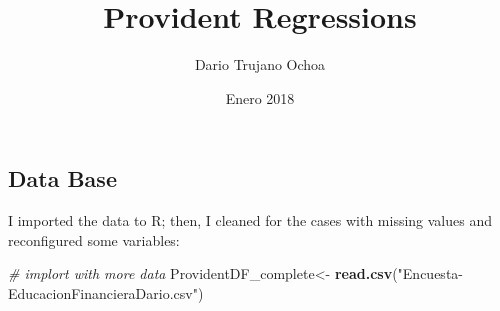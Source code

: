 \documentclass[]{article}
\title{Provident Regressions}
\author{Dario Trujano Ochoa}
\date{Enero 2018}
\newenvironment{Shaded}{\begin{snugshade}}{\end{snugshade}}
\newcommand{\KeywordTok}[1]{\textcolor[rgb]{0.13,0.29,0.53}{\textbf{#1}}}
\newcommand{\StringTok}[1]{\textcolor[rgb]{0.31,0.60,0.02}{#1}}
\newcommand{\CommentTok}[1]{\textcolor[rgb]{0.56,0.35,0.01}{\textit{#1}}}
\newcommand{\NormalTok}[1]{#1}
\begin{document}
\maketitle

\subsection{Data Base}\label{data-base}

I imported the data to R; then, I cleaned for the cases with missing
values and reconfigured some variables:

\begin{Shaded}
\begin{Highlighting}[]
\CommentTok{# implort with more data}
\NormalTok{ProvidentDF_complete<-}\StringTok{ }\KeywordTok{read.csv}\NormalTok{(}\StringTok{"Encuesta-EducacionFinancieraDario.csv"}\NormalTok{)}


\end{Highlighting}
\end{Shaded}
\end{document}
